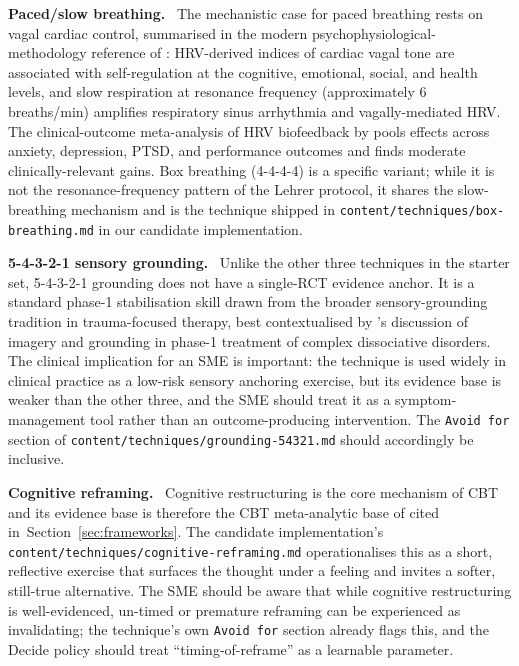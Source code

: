 \documentclass[10pt,conference]{article}
\newcommand{\secref}[1]{Section~\ref{#1}}
\renewcommand{\paragraph}[1]{\smallskip\par\noindent\textbf{#1}~\ignorespaces}
\begin{document}
\paragraph{Paced/slow breathing.} The mechanistic case for paced
breathing rests on vagal cardiac control, summarised in the modern
psychophysiological-methodology reference of
\cite{Laborde2017HRV}: HRV-derived indices of cardiac vagal tone are
associated with self-regulation at the cognitive, emotional, social,
and health levels, and slow respiration at resonance frequency
(approximately 6 breaths/min) amplifies respiratory sinus
arrhythmia and vagally-mediated HRV. The clinical-outcome
meta-analysis of HRV biofeedback by \cite{Lehrer2020HRVBiofeedback}
pools effects across anxiety, depression, PTSD, and performance
outcomes and finds moderate clinically-relevant gains. Box breathing
(4-4-4-4) is a specific variant; while it is not the resonance-frequency
pattern of the Lehrer protocol, it shares the slow-breathing mechanism
and is the technique shipped in
\texttt{content/techniques/box-breathing.md} in our candidate
implementation.

\paragraph{5-4-3-2-1 sensory grounding.} Unlike the other three
techniques in the starter set, 5-4-3-2-1 grounding does not have
a single-RCT evidence anchor. It is a standard phase-1 stabilisation
skill drawn from the broader sensory-grounding tradition in
trauma-focused therapy, best contextualised by
\cite{vanderHart2012Imagery}'s discussion of imagery and grounding in
phase-1 treatment of complex dissociative disorders. The clinical
implication for an SME is important: the technique is used
widely in clinical practice as a low-risk sensory anchoring exercise,
but its evidence base is weaker than the other three, and the SME
should treat it as a symptom-management tool rather than an
outcome-producing intervention. The \texttt{Avoid for} section of
\texttt{content/techniques/grounding-54321.md} should accordingly be
inclusive.

\paragraph{Cognitive reframing.} Cognitive restructuring is the core
mechanism of CBT and its evidence base is therefore the CBT
meta-analytic base of \cite{Hofmann2012CBTMeta} cited
in~\secref{sec:frameworks}. The candidate implementation's
\texttt{content/techniques/cognitive-reframing.md} operationalises
this as a short, reflective exercise that surfaces the thought under a
feeling and invites a softer, still-true alternative. The SME should
be aware that while cognitive restructuring is well-evidenced,
un-timed or premature reframing can be experienced as invalidating;
the technique's own \texttt{Avoid for} section already flags this,
and the Decide policy should treat ``timing-of-reframe'' as a
learnable parameter.
\end{document}
